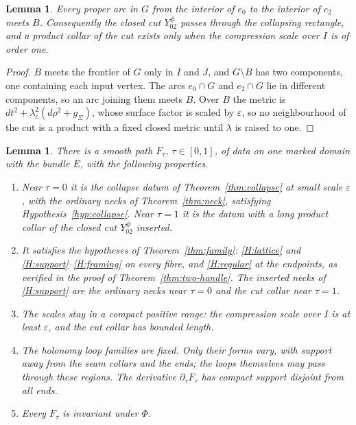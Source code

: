 \documentclass[11pt]{amsart}
\newtheorem{lemma}[theorem]{Lemma}
\theoremstyle{definition}
\theoremstyle{remark}
\theoremstyle{plain}
\numberwithin{equation}{section}
\newcommand{\eps}{\varepsilon}
\begin{document}
\begin{lemma}\label{lem:cut-crosses}
Every proper arc in $G$ from the interior of $e_0$ to the interior of $e_2$
meets $B$. Consequently the closed cut $Y_{02}^\#$ passes through the
collapsing rectangle, and a product collar of the cut exists only when the
compression scale over $I$ is of order one.
\end{lemma}

\begin{proof}
$B$ meets the frontier of $G$ only in $I$ and $J$, and $G\setminus B$ has two
components, one containing each input vertex. The arcs $e_0\cap G$ and
$e_2\cap G$ lie in different components, so an arc joining them meets $B$.
Over $B$ the metric is $dt^2+\lambda_\eps^2(d\rho^2+g_\Sigma)$, whose
surface factor is scaled by $\eps$, so no neighbourhood of the cut is a
product with a fixed closed metric until $\lambda$ is raised to one.
\end{proof}

\begin{lemma}\label{lem:family-path}
There is a smooth path $F_\tau$, $\tau\in[0,1]$, of data on one marked
domain with the bundle $E$, with the following properties.
\begin{enumerate}[label=(\roman*)]
\item Near $\tau=0$ it is the collapse datum of Theorem~\ref{thm:collapse}
  at small scale $\eps$, with the ordinary necks of Theorem~\ref{thm:neck},
  satisfying Hypothesis~\ref{hyp:collapse}. Near $\tau=1$ it is the datum
  with a long product collar of the closed cut $Y_{02}^\#$ inserted.
\item It satisfies the hypotheses of Theorem~\ref{thm:family}:
  \ref{H:lattice} and \ref{H:support}--\ref{H:framing} on every fibre,
  and \ref{H:regular} at the endpoints, as verified in the proof of
  Theorem~\ref{thm:two-handle}. The inserted necks of \ref{H:support}
  are the ordinary necks near $\tau=0$ and the cut collar near $\tau=1$.
\item The scales stay in a compact positive range: the compression
  scale over $I$ is at least $\eps$, and the cut collar has bounded length.
\item The holonomy loop families are fixed. Only their forms vary,
  with support away from the seam collars and the ends; the loops
  themselves may pass through these regions. The derivative
  $\partial_\tau F_\tau$ has compact support disjoint from all ends.
\item Every $F_\tau$ is invariant under $\Phi$.
\end{enumerate}
\end{lemma}
\end{document}
